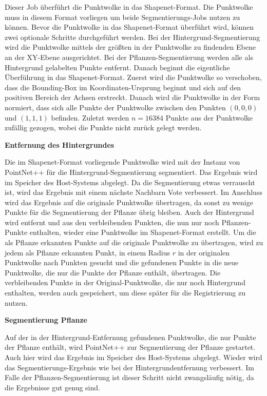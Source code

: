 \documentclass[12pt,titlepage, twoside]{article}
\begin{document}
Dieser Job überführt die Punktwolke in das Shapenet-Format. Die Punktwolke muss in diesem Format vorliegen um beide Segmentierungs-Jobs nutzen zu können.
Bevor die Punktwolke in das Shapenet-Format überführt wird, können zwei optionale Schritte durchgeführt werden.
Bei der Hintergrund-Segmentierung wird die Punktwolke mittels der größten in der Punktwolke zu findenden Ebene an der XY-Ebene ausgerichtet.
Bei der Pflanzen-Segmentierung werden alle als Hintergrund gelabelten Punkte entfernt. Danach beginnt die eigentliche Überführung in das Shapenet-Format.
Zuerst wird die Punktwolke so verschoben, dass die Bounding-Box im Koordinaten-Ursprung beginnt und sich auf den positiven Bereich der Achsen erstreckt.
Danach wird die Punktwolke in der Form normiert, dass sich alle Punkte der Punktwolke zwischen den Punkten $(0,0,0)$ und $(1,1,1)$ befinden.
Zuletzt werden $n=16384$ Punkte aus der Punktwolke zufällig gezogen, wobei die Punkte nicht zurück gelegt werden.

\textbf{Entfernung des Hintergrundes}

Die im Shapenet-Format vorliegende Punktwolke wird mit der Instanz von PointNet++ für die Hintergrund-Segmentierung segmentiert. Das Ergebnis wird im Speicher des Host-Systems abgelegt.
Da die Segmentierung etwas verrauscht ist, wird das Ergebnis mit einem \grqq{}nächste Nachbarn Vote\grqq{} verbessert.
Im Anschluss wird das Ergebnis auf die originale Punktwolke übertragen, da sonst zu wenige Punkte für die Segmentierung der Pflanze übrig bleiben.
Auch der Hintergrund wird entfernt und aus den verbleibenden Punkten, die nun nur noch Pflanzen-Punkte enthalten, wieder eine Punktwolke im Shapenet-Format erstellt.
Um die als Pflanze erkannten Punkte auf die originale Punktwolke zu übertragen, wird zu jedem als Pflanze erkannten Punkt, in einem Radius $r$ in der originalen Punktwolke nach Punkten gesucht 
und die gefundenen Punkte in die neue Punktwolke, die nur die Punkte der Pflanze enthält, übertragen. 
Die verbleibenden Punkte in der Original-Punktwolke, die nur noch Hintergrund enthalten, werden auch gespeichert, um diese später für die Registrierung zu nutzen.

\textbf{Segmentierung Pflanze}

Auf der in der Hintergrund-Entfernung gefundenen Punktwolke, die nur Punkte der Pflanze enthält, wird PointNet++ zur Segmentierung der Pflanze gestartet. Auch hier wird das Ergebnis im Speicher des Host-Systems abgelegt. 
Wieder wird das Segmentierungs-Ergebnis wie bei der Hintergrundentfernung verbessert. Im Falle der Pflanzen-Segmentierung ist dieser Schritt nicht zwangsläufig nötig, da die Ergebnisse gut genug sind.
\end{document}
